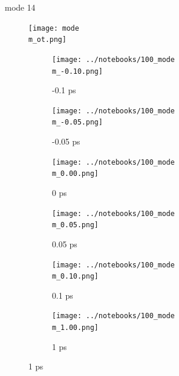 \documentclass{beamer}
\begin{document}
\renewcommand\m{14}
\begin{frame}{mode \m}
		\vspace{\vh mm}
	\begin{figure}
		\centering
		\texttt{[image: mode\\m\_ot.png]}
	\end{figure}
	\begin{figure}
		\centering
		\begin{subfigure}[b]{\w\textwidth}
			\centering
			\texttt{[image: ../notebooks/100\_mode\\m\_-0.10.png]}
			\caption{-0.1 ps}
		\end{subfigure}
		\begin{subfigure}[b]{\w\textwidth}
			\centering
			\texttt{[image: ../notebooks/100\_mode\\m\_-0.05.png]}
			\caption{-0.05 ps}
		\end{subfigure}
		\begin{subfigure}[b]{\w\textwidth}
			\centering
			\texttt{[image: ../notebooks/100\_mode\\m\_0.00.png]}
			\caption{0 ps}
		\end{subfigure}
		\begin{subfigure}[b]{\w\textwidth}
			\centering
			\texttt{[image: ../notebooks/100\_mode\\m\_0.05.png]}
			\caption{0.05 ps}
		\end{subfigure}
		\begin{subfigure}[b]{\w\textwidth}
			\centering
			\texttt{[image: ../notebooks/100\_mode\\m\_0.10.png]}
			\caption{0.1 ps}
		\end{subfigure}
		\begin{subfigure}[b]{\w\textwidth}
			\centering
			\texttt{[image: ../notebooks/100\_mode\\m\_1.00.png]}
			\caption{1 ps}
		\end{subfigure}
	\end{figure}
\end{frame}
\end{document}
